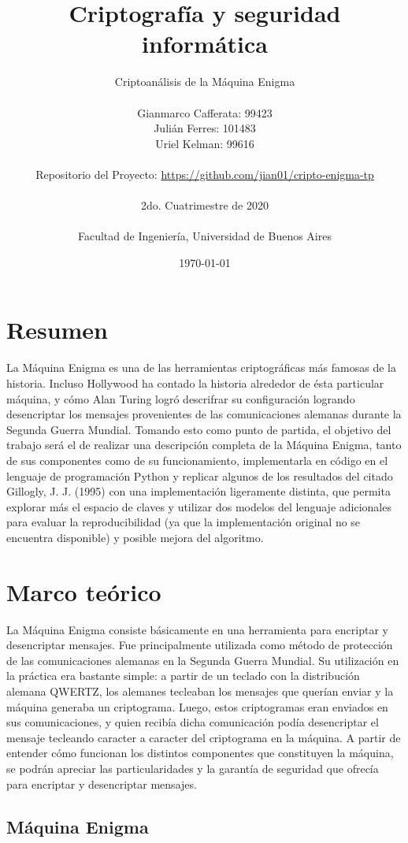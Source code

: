 \documentclass[a4paper,10pt]{article}
\title{ \Huge \textbf {Criptografía y seguridad informática}}
\author{
  \Huge Criptoanálisis de la Máquina Enigma\\
  \\
    \LARGE {Gianmarco Cafferata: 99423} \\
  \LARGE {Julián Ferres: 101483} \\
  \LARGE {Uriel Kelman: 99616} \\
  \\
  Repositorio del Proyecto: \href{https://github.com/jian01/cripto-enigma-tp}{https://github.com/jian01/cripto-enigma-tp} \\
  \\

  \LARGE   2do. Cuatrimestre de 2020 \\
  \\
  \LARGE  Facultad de Ingeniería, Universidad de Buenos Aires  \\}
\date{\today}
\begin{document}
  \maketitle
  \thispagestyle{empty}
  \newpage
  \tableofcontents
  \newpage

\section{Resumen}


La Máquina Enigma es una de las herramientas criptográficas más famosas de la historia. Incluso Hollywood ha contado la historia alrededor de ésta particular máquina, y cómo Alan Turing logró descrifrar su configuración logrando desencriptar los mensajes provenientes de las comunicaciones alemanas durante la Segunda Guerra Mundial. Tomando esto como punto de partida, el objetivo del trabajo será el de realizar una descripción completa de la Máquina Enigma, tanto de sus componentes como de su funcionamiento, implementarla en código en el lenguaje de programación Python y replicar algunos de los resultados del citado Gillogly, J. J. (1995)\cite{gillogly} con una implementación ligeramente distinta, que permita explorar más el espacio de claves y utilizar dos modelos del lenguaje adicionales para evaluar la reproducibilidad (ya que la implementación original no se encuentra disponible) y posible mejora del algoritmo.

\section{Marco teórico}

La Máquina Enigma consiste básicamente en una herramienta para encriptar y desencriptar mensajes. Fue principalmente utilizada como método de protección de las comunicaciones alemanas en la Segunda Guerra Mundial. Su utilización en la práctica era bastante simple: a partir de un teclado con la distribución alemana QWERTZ, los alemanes tecleaban los mensajes que querían enviar y la máquina generaba un criptograma. Luego, estos criptogramas eran enviados en sus comunicaciones, y quien recibía dicha comunicación podía desencriptar el mensaje tecleando caracter a caracter del criptograma en la máquina. A partir de entender cómo funcionan los distintos componentes que constituyen la máquina, se podrán apreciar las particularidades y la garantía de seguridad que ofrecía para encriptar y desencriptar mensajes.

\subsection{Máquina Enigma}
\end{document}
